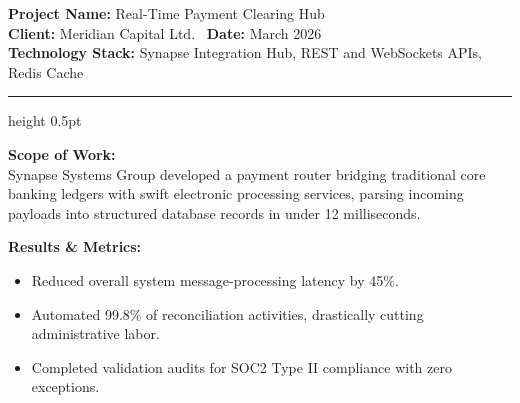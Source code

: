 \begin{tcolorbox}[proposalbox, title=Case Study 2: Meridian Capital Group]
  \textbf{Project Name:} Real-Time Payment Clearing Hub \\
  \textbf{Client:} Meridian Capital Ltd. \textperiodcentered\ \textbf{Date:} March 2026 \\
  \textbf{Technology Stack:} Synapse Integration Hub, REST and WebSockets APIs, Redis Cache

  \medskip
  {\color{border}\hrule height 0.5pt}
  \medskip

  \textbf{Scope of Work:} \\
  Synapse Systems Group developed a payment router bridging traditional core banking ledgers with swift electronic processing services, parsing incoming payloads into structured database records in under 12 milliseconds.

  \textbf{Results \& Metrics:}
  \begin{itemize}
    \item Reduced overall system message-processing latency by 45\%.
    \item Automated 99.8\% of reconciliation activities, drastically cutting administrative labor.
    \item Completed validation audits for SOC2 Type II compliance with zero exceptions.
  \end{itemize}
\end{tcolorbox}
